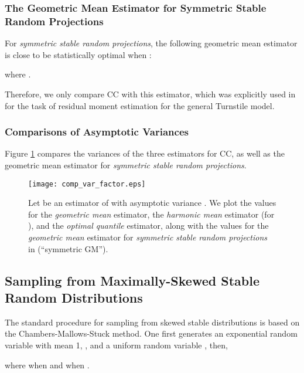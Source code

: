 \documentclass{sig-alternate}
\begin{document}
\subsubsection{The Geometric Mean Estimator for Symmetric Stable Random Projections}


For {\em symmetric stable random projections}, the following geometric mean estimator is close to be statistically optimal when  \cite{Proc:Li_SODA08}:

\noindent where .

Therefore, we only compare CC with this estimator, which was explicitly used  in \cite{Article:Harvey_entropy_arXiv08,Proc:Harvey_FOCS08}  for the task of residual moment estimation for the general Turnstile model. 

\subsubsection{Comparisons of Asymptotic Variances}

Figure \ref{fig_comp_var_factor} compares the variances of the three estimators for CC, as well as the geometric mean estimator for {\em symmetric stable random projections}.

\begin{figure}[h]
\begin{center}
\texttt{[image: comp\_var\_factor.eps]}
\end{center}
\vspace{-0.3in}
\caption{Let  be an estimator of  with asymptotic variance . We plot the  values for the {\em geometric mean} estimator,  the {\em harmonic mean} estimator (for ), and the {\em optimal quantile} estimator, along with the  values for the {\em geometric mean} estimator for {\em symmetric stable random projections} in \cite{Proc:Li_SODA08} (``symmetric GM'').
}\label{fig_comp_var_factor}
\end{figure}


\subsection{Sampling from Maximally-Skewed Stable Random Distributions}


The standard procedure for sampling from skewed stable distributions is based on the Chambers-Mallows-Stuck method\cite{Article:Chambers_JASA76}. One first generates an exponential random variable with mean 1, ,  and a uniform random variable , then,

where  when  and  when . \\
\end{document}
